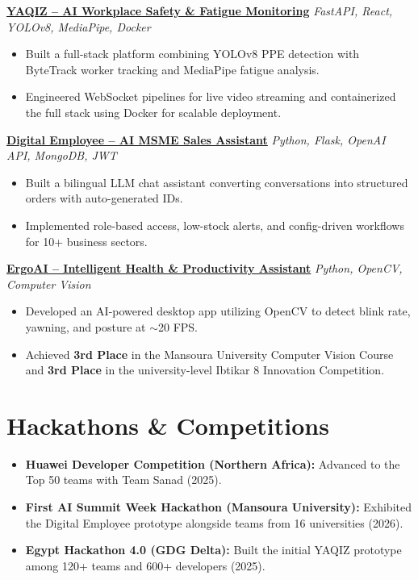 \documentclass[a4paper,10pt]{article}
\begin{document}
\vspace{1mm}

\textbf{\href{https://github.com/Demro7/YAQIZ}{YAQIZ -- AI Workplace Safety \& Fatigue Monitoring}} \hfill \textit{FastAPI, React, YOLOv8, MediaPipe, Docker}
\begin{itemize}[noitemsep, topsep=0pt, leftmargin=*]
    \item Built a full-stack platform combining YOLOv8 PPE detection with ByteTrack worker tracking and MediaPipe fatigue analysis.
    \item Engineered WebSocket pipelines for live video streaming and containerized the full stack using Docker for scalable deployment.
\end{itemize}

\vspace{1mm}

\textbf{\href{https://github.com/Demro7/Digital-Employee}{Digital Employee -- AI MSME Sales Assistant}} \hfill \textit{Python, Flask, OpenAI API, MongoDB, JWT}
\begin{itemize}[noitemsep, topsep=0pt, leftmargin=*]
    \item Built a bilingual LLM chat assistant converting conversations into structured orders with auto-generated IDs.
    \item Implemented role-based access, low-stock alerts, and config-driven workflows for 10+ business sectors.
\end{itemize}

\vspace{1mm}

\textbf{\href{https://github.com/magedyasse/ErgoAi}{ErgoAI -- Intelligent Health \& Productivity Assistant}} \hfill \textit{Python, OpenCV, Computer Vision}
\begin{itemize}[noitemsep, topsep=0pt, leftmargin=*]
    \item Developed an AI-powered desktop app utilizing OpenCV to detect blink rate, yawning, and posture at $\sim$20 FPS.
    \item Achieved \textbf{3rd Place} in the Mansoura University Computer Vision Course and \textbf{3rd Place} in the university-level Ibtikar 8 Innovation Competition.
\end{itemize}

\section{Hackathons \& Competitions}
\begin{itemize}[noitemsep, topsep=0pt, leftmargin=*]
    \item \textbf{Huawei Developer Competition (Northern Africa):} Advanced to the Top 50 teams with Team Sanad (2025).
    \item \textbf{First AI Summit Week Hackathon (Mansoura University):} Exhibited the Digital Employee prototype alongside teams from 16 universities (2026).
    \item \textbf{Egypt Hackathon 4.0 (GDG Delta):} Built the initial YAQIZ prototype among 120+ teams and 600+ developers (2025).
\end{itemize}
\end{document}
